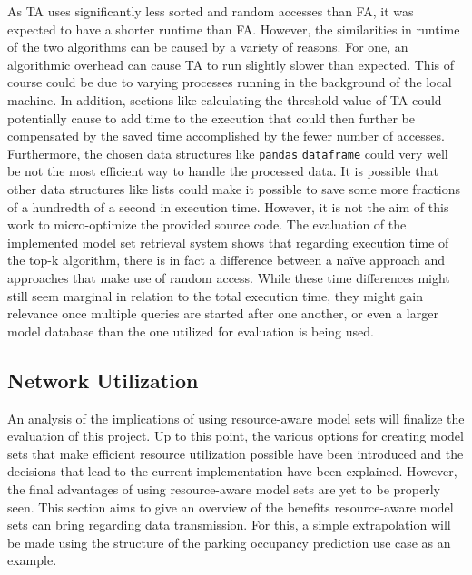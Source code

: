 As TA uses significantly less sorted and random accesses than FA, it was expected to have a shorter runtime than FA. However, the similarities in runtime of the two algorithms can be caused by a variety of reasons. For one, an algorithmic overhead can cause TA to run slightly slower than expected. This of course could be due to varying processes running in the background of the local machine. In addition, sections like calculating the threshold value of TA could potentially cause to add time to the execution that could then further be compensated by the saved time accomplished by the fewer number of accesses. Furthermore, the chosen data structures like \texttt{pandas} \texttt{dataframe} could very well be not the most efficient way to handle the processed data. It is possible that other data structures like lists could make it possible to save some more fractions of a hundredth of a second in execution time. However, it is not the aim of this work to micro-optimize the provided source code. The evaluation of the implemented model set retrieval system shows that regarding execution time of the top-k algorithm, there is in fact a difference between a naïve approach and approaches that make use of random access. While these time differences might still seem marginal in relation to the total execution time, they might gain relevance once multiple queries are started after one another, or even a larger model database than the one utilized for evaluation is being used.
  
  
  
\subsection{Network Utilization}


An analysis of the implications of using resource-aware model sets will finalize the evaluation of this project. Up to this point, the various options for creating model sets that make efficient resource utilization possible have been introduced and the decisions that lead to the current implementation have been explained. However, the final advantages of using resource-aware model sets are yet to be properly seen. This section aims to give an overview of the benefits resource-aware model sets can bring regarding data transmission. For this, a simple extrapolation will be made using the structure of the parking occupancy prediction use case as an example.

